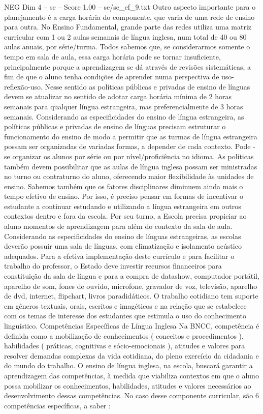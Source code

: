 \begin{textsample}{NEG Dim 4 – se – Score 1.00 – se/se\_ef\_9.txt}
Outro aspecto importante para o planejamento é a carga horária do componente, que varia de uma rede de ensino para outra.
No Ensino Fundamental, grande parte das redes utiliza uma matriz curricular com 1 ou 2 aulas semanais de língua inglesa, num total de 40 ou 80 aulas anuais, por série/turma.
Todos sabemos que, se considerarmos somente o tempo em sala de aula, essa carga horária pode se tornar insuficiente, principalmente porque a aprendizagem se dá através de revisões sistemáticas, a fim de que o aluno tenha condições de aprender numa perspectiva de uso-reflexão-uso.
Nesse sentido as políticas públicas e privadas de ensino de línguas devem se atualizar no sentido de adotar carga horária mínima de 2 horas semanais para qualquer língua estrangeira, mas preferencialmente de 3 horas semanais.
Considerando as especificidades do ensino de língua estrangeira, as políticas públicas e privadas de ensino de línguas precisam estruturar o funcionamento do ensino de modo a permitir que as turmas de língua estrangeira possam ser organizadas de variadas formas, a depender de cada contexto.
Pode -se organizar os alunos por série ou por nível/proficiência no idioma.
As políticas também devem possibilitar que as aulas de língua inglesa possam ser ministradas no turno ou contraturno do aluno, oferecendo maior flexibilidade às unidades de ensino.
Sabemos também que os fatores disciplinares diminuem ainda mais o tempo efetivo de ensino.
Por isso, é preciso pensar em formas de incentivar o estudante a continuar estudando e utilizando a língua estrangeira em outros contextos dentro e fora da escola.
Por seu turno, a Escola precisa propiciar ao aluno momentos de aprendizagem para além do contexto da sala de aula.
Considerando as especificidades do ensino de línguas estrangeiras, as escolas deverão possuir uma sala de línguas, com climatização e isolamento acústico adequados.
Para a efetiva implementação deste currículo e para facilitar o trabalho do professor, o Estado deve investir recursos financeiros para constituição da sala de língua e para a compra de datashow, computador portátil, aparelho de som, fones de ouvido, microfone, gravador de voz, televisão, aparelho de dvd, internet, flipchart, livros paradidáticos.
O trabalho cotidiano tem suporte em gêneros textuais, orais, escritos e imagéticos e na relação que se estabelece com os temas de interesse dos estudantes que estimula o uso do conhecimento linguístico.
Competências Específicas de Língua Inglesa Na BNCC, competência é definida como a mobilização de conhecimentos ( conceitos e procedimentos ), habilidades ( práticas, cognitivas e sócio-emocionais ), atitudes e valores para resolver demandas complexas da vida cotidiana, do pleno exercício da cidadania e do mundo do trabalho.
O ensino de língua inglesa, na escola, buscará garantir a aprendizagem das competências, à medida que viabiliza contextos em que o aluno possa mobilizar os conhecimentos, habilidades, atitudes e valores necessários ao desenvolvimento dessas competências.
No caso desse componente curricular, são 6 competências específicas, a saber :

\end{textsample}
